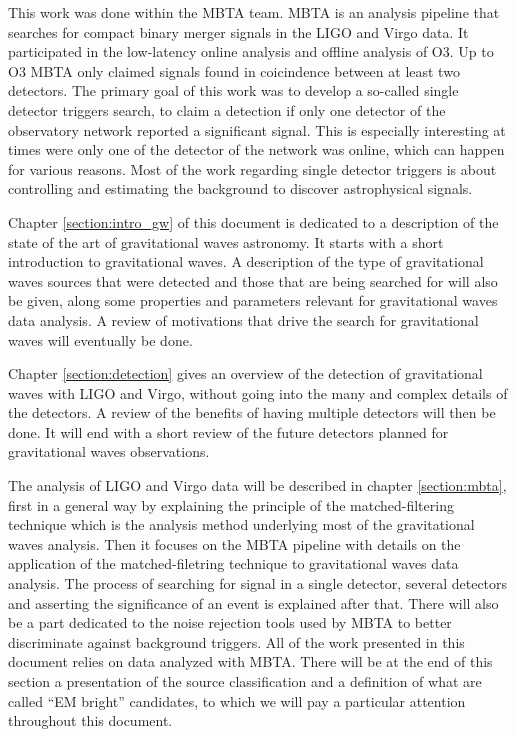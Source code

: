 This work was done within the MBTA team.
MBTA is an analysis pipeline that searches for compact binary merger signals in the LIGO and Virgo data.
It participated in the low-latency online analysis and offline analysis of O3.
Up to O3 MBTA only claimed signals found in coicindence between at least two detectors.
The primary goal of this work was to develop a so-called single detector triggers search, to claim a detection if only one detector of the observatory network reported a significant signal.
This is especially interesting at times were only one of the detector of the network was online, which can happen for various reasons. 
Most of the work regarding single detector triggers is about controlling and estimating the background to discover astrophysical signals.


Chapter \ref{section:intro_gw} of this document is dedicated to a description of the state of the art of gravitational waves astronomy.
It starts with a short introduction to gravitational waves.
A description of the type of gravitational waves sources that were detected and those that are being searched for will also be given, along some properties and parameters relevant for gravitational waves data analysis.
A review of motivations that drive the search for gravitational waves will eventually be done.

Chapter \ref{section:detection} gives an overview of the detection of gravitational waves with LIGO and Virgo, without going into the many and complex details of the detectors.
A review of the benefits of having multiple detectors will then be done.
It will end with a short review of the future detectors planned for gravitational waves observations.

The analysis of LIGO and Virgo data will be described in chapter \ref{section:mbta}, first in a general way by explaining the principle of the matched-filtering technique which is the analysis method underlying most of the gravitational waves analysis.
Then it focuses on the MBTA pipeline with details on the application of the matched-filetring technique to gravitational waves data analysis.
The process of searching for signal in a single detector, several detectors and asserting the significance of an event is explained after that.
There will also be a part dedicated to the noise rejection tools used by MBTA to better discriminate against background triggers.
All of the work presented in this document relies on data analyzed with MBTA.
There will be at the end of this section a presentation of the source classification and a definition of what are called ``EM bright'' candidates, to which we will pay a particular attention throughout this document.


